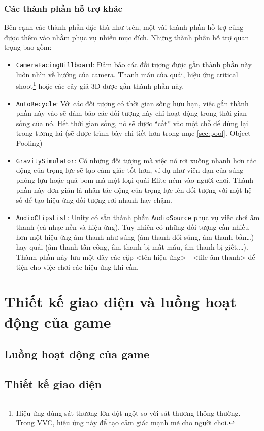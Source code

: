 \documentclass[12pt]{report}
\newcommand{\project}{VVC}
\begin{document}
\subsubsection{Các thành phần hỗ trợ khác}
Bên cạnh các thành phần đặc thù như trên, một vài thành phần hỗ trợ cũng được thêm vào nhằm phục vụ nhiều mục đích. Những thành phần hỗ trợ quan trọng bao gồm:
\begin{itemize}
	\item \texttt{CameraFacingBillboard}: Đảm bảo các đối tượng được gắn thành phần này luôn nhìn về hướng của camera. Thanh máu của quái, hiệu ứng critical shoot\footnote{Hiệu ứng dùng sát thương lớn đột ngột so với sát thương thông thường. Trong \project, hiệu ứng này để tạo cảm giác mạnh mẽ cho người chơi.} hoặc các cây giả 3D được gắn thành phần này.
	\item \texttt{AutoRecycle}: Với các đối tượng có thời gian sống hữu hạn, việc gắn thành phần này vào sẽ đảm bảo các đối tượng này chỉ hoạt động trong thời gian sống của nó. Hết thời gian sống, nó sẽ được ``cất'' vào một chỗ để dùng lại trong tương lai (sẽ được trình bày chi tiết hơn trong mục \ref{sec:pool}. Object Pooling)
	\item \texttt{GravitySimulator}: Có những đối tượng mà việc nó rơi xuống nhanh hơn tác động của trọng lực sẽ tạo cảm giác tốt hơn, ví dụ như viên đạn của súng phóng lựu hoặc quả bom mà một loại quái Elite ném vào người chơi. Thành phần này đơn giản là nhân tác động của trọng lực lên đối tượng với một hệ số để tạo hiệu ứng đối tượng rơi nhanh hay chậm.
	\item \texttt{AudioClipsList}: Unity có sẵn thành phần \texttt{AudioSource} phục vụ việc chơi âm thanh (cả nhạc nền và hiệu ứng). Tuy nhiên có những đối tượng cần nhiều hơn một hiệu ứng âm thanh như súng (âm thanh đổi súng, âm thanh bắn\ldots) hay quái (âm thanh tấn công, âm thanh bị mất máu, âm thanh bị giết,\ldots). Thành phần này lưu một dãy các cặp <tên hiệu ứng> - <file âm thanh> để tiện cho việc chơi các hiệu ứng khi cần.
\end{itemize}

\section{Thiết kế giao diện và luồng hoạt động của game}
\subsection{Luồng hoạt động của game}
\subsection{Thiết kế giao diện}
\end{document}
